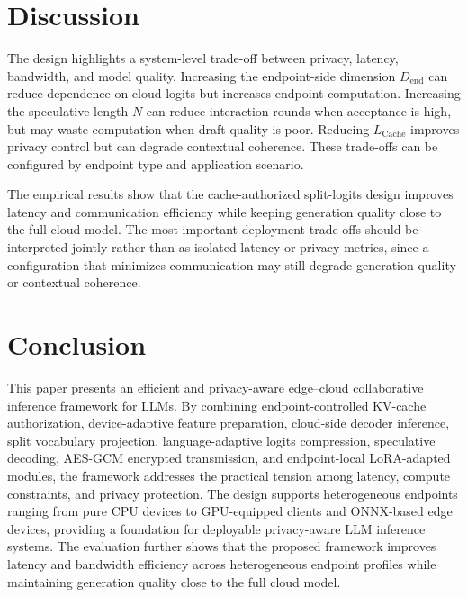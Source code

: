 \documentclass{article}
\newcommand{\Cache}{\mathrm{Cache}}
\newcommand{\End}{\mathrm{end}}
\begin{document}
\FloatBarrier
\section{Discussion}

The design highlights a system-level trade-off between privacy, latency, bandwidth, and model quality. Increasing the endpoint-side dimension $D_{\End}$ can reduce dependence on cloud logits but increases endpoint computation. Increasing the speculative length $N$ can reduce interaction rounds when acceptance is high, but may waste computation when draft quality is poor. Reducing $L_{\Cache}$ improves privacy control but can degrade contextual coherence. These trade-offs can be configured by endpoint type and application scenario.

The empirical results show that the cache-authorized split-logits design improves latency and communication efficiency while keeping generation quality close to the full cloud model. The most important deployment trade-offs should be interpreted jointly rather than as isolated latency or privacy metrics, since a configuration that minimizes communication may still degrade generation quality or contextual coherence.

\FloatBarrier
\section{Conclusion}

This paper presents an efficient and privacy-aware edge--cloud collaborative inference framework for LLMs. By combining endpoint-controlled KV-cache authorization, device-adaptive feature preparation, cloud-side decoder inference, split vocabulary projection, language-adaptive logits compression, speculative decoding, AES-GCM encrypted transmission, and endpoint-local LoRA-adapted modules, the framework addresses the practical tension among latency, compute constraints, and privacy protection. The design supports heterogeneous endpoints ranging from pure CPU devices to GPU-equipped clients and ONNX-based edge devices, providing a foundation for deployable privacy-aware LLM inference systems. The evaluation further shows that the proposed framework improves latency and bandwidth efficiency across heterogeneous endpoint profiles while maintaining generation quality close to the full cloud model.

\FloatBarrier



\end{document}
